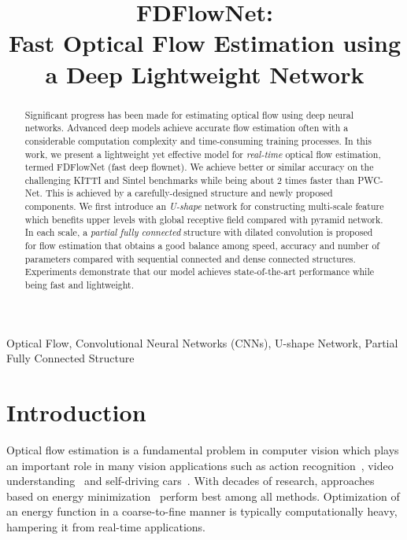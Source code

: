 \documentclass{article}
\title{FDFlowNet: \\Fast Optical Flow Estimation using a Deep Lightweight Network}
\begin{document}
\maketitle
\begin{abstract}
Significant progress has been made for estimating optical flow using deep neural networks. Advanced deep models achieve accurate flow estimation often with a considerable computation complexity and time-consuming training processes. In this work, we present a
lightweight yet effective model for {\it real-time} optical flow estimation, termed FDFlowNet (fast deep flownet). We achieve better or similar accuracy on the challenging KITTI and Sintel benchmarks while being about 2 times faster than PWC-Net. This is achieved by a carefully-designed structure and newly proposed components. We first introduce an {\it U-shape} network for constructing multi-scale feature which benefits upper levels with global receptive field compared with pyramid network. In each scale, a {\it partial fully connected} structure with dilated convolution is proposed for flow estimation that obtains a good balance among speed, accuracy and number of parameters compared with sequential connected and dense connected structures. Experiments demonstrate that our model achieves state-of-the-art performance while being fast and lightweight.
\end{abstract}
\begin{keywords}
Optical Flow, Convolutional Neural Networks (CNNs), U-shape Network, Partial Fully Connected Structure
\end{keywords}
\section{Introduction}
Optical flow estimation is a fundamental problem in computer vision which plays an important role in many vision applications such as action recognition~\cite{NIPS2014_5353}, video understanding~\cite{Fan_2018_CVPR} and self-driving
cars~\cite{8658397,Kong2019ICONIP}. With decades of research, approaches based on energy minimization~\cite{Horn:1981} perform best among all methods.  Optimization of an energy function in a coarse-to-fine manner is typically computationally heavy, hampering it from real-time applications.
\end{document}

